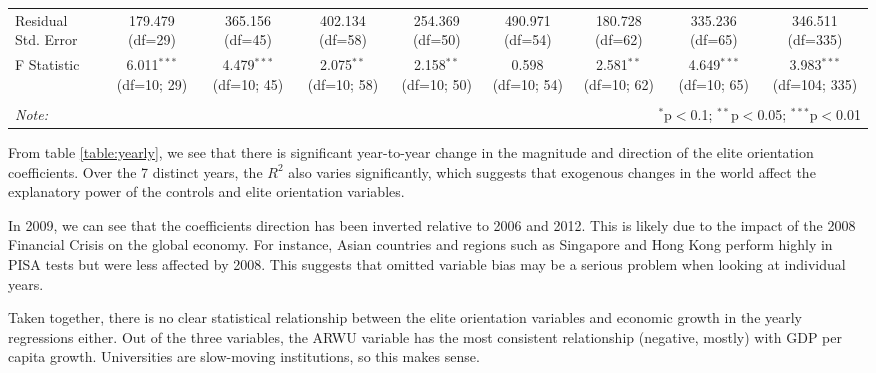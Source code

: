 \documentclass[11pt]{article}
\begin{document}
\begin{table}[H]
{\begin{tabular}{@{\extracolsep{1pt}}lcccccccc}
            Residual Std. Error & 179.479 (df=29) & 365.156 (df=45) & 402.134 (df=58) & 254.369 (df=50) & 490.971 (df=54) & 180.728 (df=62) & 335.236 (df=65) & 346.511 (df=335) \\
            F Statistic & 6.011$^{***}$ (df=10; 29) & 4.479$^{***}$ (df=10; 45) & 2.075$^{**}$ (df=10; 58) & 2.158$^{**}$ (df=10; 50) & 0.598$^{}$ (df=10; 54) & 2.581$^{**}$ (df=10; 62) & 4.649$^{***}$ (df=10; 65) & 3.983$^{***}$ (df=104; 335) \\
            \hline
            \hline \\[-1.8ex]
            \textit{Note:} & \multicolumn{8}{r}{$^{*}$p$<$0.1; $^{**}$p$<$0.05; $^{***}$p$<$0.01} \\
            \end{tabular}
}
\end{table}

From table \ref{table:yearly}, we see that there is significant year-to-year change in the magnitude and direction of the elite orientation coefficients. Over the 7 distinct years, the $R^2$ also varies significantly, which suggests that exogenous changes in the world affect the explanatory power of the controls and elite orientation variables.

In 2009, we can see that the coefficients direction has been inverted relative to 2006 and 2012. This is likely due to the impact of the 2008 Financial Crisis on the global economy. For instance, Asian countries and regions such as Singapore and Hong Kong perform highly in PISA tests but were less affected by 2008. This suggests that omitted variable bias may be a serious problem when looking at individual years.

Taken together, there is no clear statistical relationship between the elite orientation variables and economic growth in the yearly regressions either. Out of the three variables, the ARWU variable has the most consistent relationship (negative, mostly) with GDP per capita growth. Universities are slow-moving institutions, so this makes sense.
\end{document}
